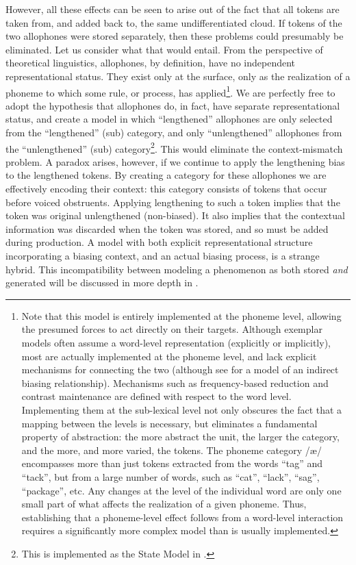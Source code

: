 However, all these effects can be seen to arise out of the fact that
all tokens are taken from, and added back to, the same undifferentiated
cloud. If tokens of the two allophones were stored separately, then
these problems could presumably be eliminated. Let us consider what
that would entail. From the perspective of theoretical linguistics,
allophones, by definition, have no independent representational status.
They exist only at the surface, only as the realization of a phoneme
to which some rule, or process, has applied\footnote{Note that this model is entirely implemented at the phoneme level,
allowing the presumed forces to act directly on their targets. Although
exemplar models often assume a word-level representation (explicitly
or implicitly), most are actually implemented at the phoneme level,
and lack explicit mechanisms for connecting the two (although see
\citet{Wedel2008} for a model of an indirect biasing relationship).
Mechanisms such as frequency-based reduction and contrast maintenance
are defined with respect to the word level. Implementing them at the
sub-lexical level not only obscures the fact that a mapping between
the levels is necessary, but eliminates a fundamental property of
abstraction: the more abstract the unit, the larger the category,
and the more, and more varied, the tokens. The phoneme category {/æ/}
encompasses more than just tokens extracted from the words “tag”
and “tack”, but from a large number of words, such as “cat”,
“lack”, “sag”, “package”, etc. Any changes at the
level of the individual word are only one small part of what affects
the realization of a given phoneme. Thus, establishing that a phoneme-level
effect follows from a word-level interaction requires a significantly
more complex model than is usually implemented. }. We are perfectly free to adopt the hypothesis that allophones do,
in fact, have separate representational status, and create a model
in which “lengthened” allophones are only selected from the
“lengthened” (sub) category, and only “unlengthened” allophones
from the “unlengthened” (sub) category\footnote{This is implemented as the State Model in .}.
This would eliminate the context-mismatch problem. A paradox arises,
however, if we continue to apply the lengthening bias to the lengthened
tokens. By creating a category for these allophones we are effectively
encoding their context: this category consists of tokens that occur
before voiced obstruents. Applying lengthening to such a token implies
that the token was original unlengthened (non-biased). It also implies
that the contextual information was discarded when the token was stored,
and so must be added during production. A model with both explicit
representational structure incorporating a biasing context, and an
actual biasing process, is a strange hybrid. This incompatibility
between modeling a phenomenon as both stored \emph{and} generated
will be discussed in more depth in . 

